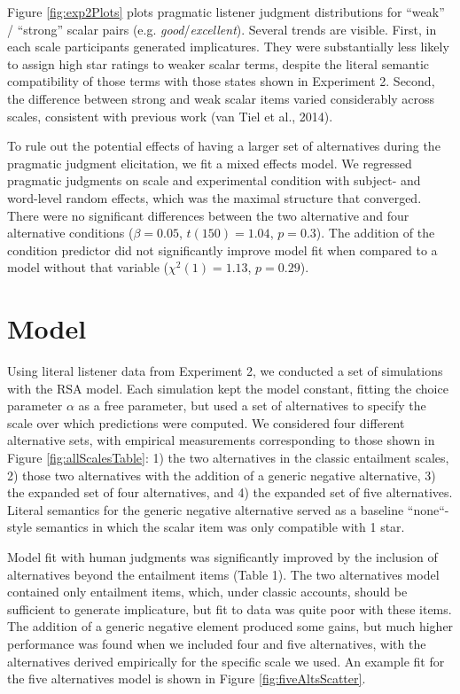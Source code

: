 \documentclass[10pt, letterpaper]{article}
\begin{document}
Figure \ref{fig:exp2Plots} plots pragmatic listener judgment
distributions for ``weak'' / ``strong'' scalar pairs (e.g.
\emph{good}/\emph{excellent}). Several trends are visible. First, in
each scale participants generated implicatures. They were substantially
less likely to assign high star ratings to weaker scalar terms, despite
the literal semantic compatibility of those terms with those states
shown in Experiment 2. Second, the difference between strong and weak
scalar items varied considerably across scales, consistent with previous
work ({van Tiel} et al., 2014).

To rule out the potential effects of having a larger set of alternatives
during the pragmatic judgment elicitation, we fit a mixed effects model.
We regressed pragmatic judgments on scale and experimental condition
with subject- and word-level random effects, which was the maximal
structure that converged. There were no significant differences between
the two alternative and four alternative conditions (\(\beta = 0.05\),
\(t(150) = 1.04\), \(p = 0.3\)). The addition of the condition predictor
did not significantly improve model fit when compared to a model without
that variable (\(\chi^2(1) = 1.13\), \(p = 0.29\)).

\section{Model}\label{model}

Using literal listener data from Experiment 2, we conducted a set of
simulations with the RSA model. Each simulation kept the model constant,
fitting the choice parameter \(\alpha\) as a free parameter, but used a
set of alternatives to specify the scale over which predictions were
computed. We considered four different alternative sets, with empirical
measurements corresponding to those shown in Figure
\ref{fig:allScalesTable}: 1) the two alternatives in the classic
entailment scales, 2) those two alternatives with the addition of a
generic negative alternative, 3) the expanded set of four alternatives,
and 4) the expanded set of five alternatives. Literal semantics for the
generic negative alternative served as a baseline ``none``-style
semantics in which the scalar item was only compatible with 1 star.

Model fit with human judgments was significantly improved by the
inclusion of alternatives beyond the entailment items (Table 1). The two
alternatives model contained only entailment items, which, under classic
accounts, should be sufficient to generate implicature, but fit to data
was quite poor with these items. The addition of a generic negative
element produced some gains, but much higher performance was found when
we included four and five alternatives, with the alternatives derived
empirically for the specific scale we used. An example fit for the five
alternatives model is shown in Figure \ref{fig:fiveAltsScatter}.
\end{document}
